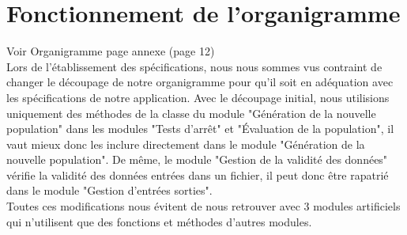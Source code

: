 \documentclass[a4paper,11pt]{article}
\begin{document}
	
	\section{Fonctionnement de l'organigramme}
		Voir Organigramme page annexe (page 12)\\

		Lors de l'établissement des spécifications, nous nous sommes vus contraint de changer le découpage de notre organigramme pour qu’il soit en adéquation avec les spécifications de notre application. 
		Avec le découpage initial, nous utilisions uniquement des méthodes de la classe du module "Génération de la nouvelle population" dans les modules "Tests d’arrêt" et "Évaluation de la population", il vaut mieux donc les inclure directement dans le module "Génération de la nouvelle population".
		De même, le module "Gestion de la validité des données" vérifie la validité des données entrées dans un fichier, il peut donc être rapatrié dans le module "Gestion d'entrées sorties". \\
		Toutes ces modifications nous évitent de nous retrouver avec 3 modules artificiels qui n'utilisent que des fonctions et méthodes d'autres modules.\\

		
		
\end{document}
